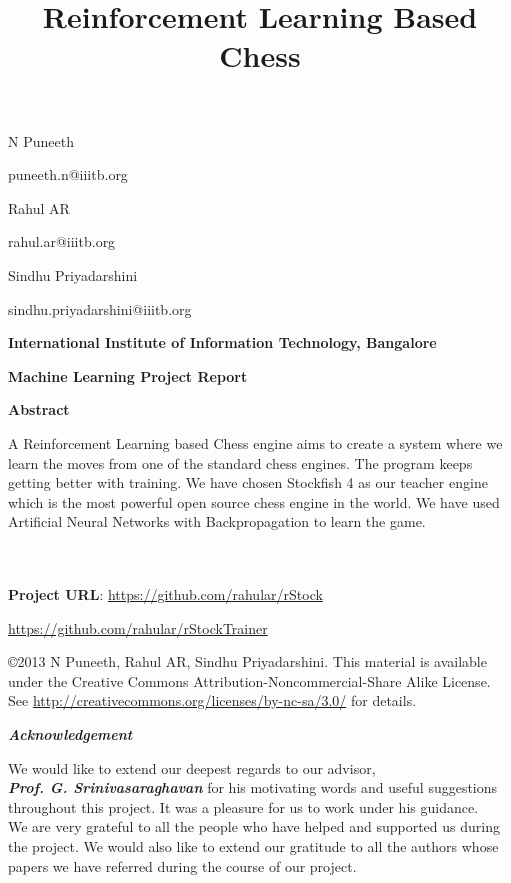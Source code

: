 \documentclass[a4paper,12pt,latin modern roman]{article}
\begin{document}
\thispagestyle{empty}
\title{\bf Reinforcement Learning Based Chess}
\maketitle
\centerline{N Puneeth}
\centerline{puneeth.n@iiitb.org}
\vspace{0.2in}
\centerline{Rahul AR}
\centerline{rahul.ar@iiitb.org}
\vspace{0.2in}
\centerline{Sindhu Priyadarshini}
\centerline{sindhu.priyadarshini@iiitb.org}
\vspace{0.5in}
\centerline{\textbf{International Institute of Information Technology, Bangalore}}
\vspace{0.1in}
\vspace{0.1in}
\centerline{\textbf{Machine Learning Project Report}}
\thispagestyle{empty}
\newpage
\thispagestyle{empty}
\begin{center}
\textbf{\large{Abstract}}\\
\par\end{center}
A Reinforcement Learning based Chess engine aims to create a system where we learn the moves from one of the standard chess engines. The program keeps getting better with training. We have chosen Stockfish 4 as our teacher engine which is the most powerful open source chess engine in the world. We have used Artificial Neural Networks with Backpropagation to learn the game.    \\\\\\
\centerline{\textbf{Project URL}: \url {https://github.com/rahular/rStock}  }
\centerline{\textbf{} \url {https://github.com/rahular/rStockTrainer}  }
\vspace{0.5in}
\vfill
\copyright 2013 N Puneeth, Rahul AR, Sindhu Priyadarshini. This material is available under the Creative Commons Attribution-Noncommercial-Share Alike License.\\ See \url{http://creativecommons.org/licenses/by-nc-sa/3.0/} for details.
\newpage
\thispagestyle{empty}
\begin{center}
\textbf{\large{\emph{Acknowledgement}}}
\end{center}
We would like to extend our deepest regards to our advisor, \\\textbf{\emph{Prof. G. Srinivasaraghavan}} for his motivating words and useful suggestions throughout this project. It was a pleasure for us to work under his guidance.\\
We are very grateful to all the people who have helped and supported us during the project. We would also like to extend our gratitude to all the authors whose papers we have referred during the course of our project.
\newpage
\thispagestyle{empty}
\tableofcontents
\newpage
\thispagestyle{empty}
\listoffigures{}
\newpage
\end{document}

